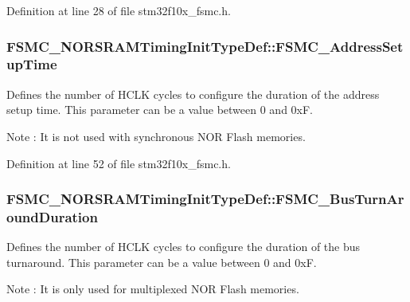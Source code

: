 Definition at line 28 of file stm32f10x\+\_\+fsmc.\+h.

\subsubsection[{\texorpdfstring{F\+S\+M\+C\+\_\+\+Address\+Setup\+Time}{FSMC_AddressSetupTime}}]{ F\+S\+M\+C\+\_\+\+N\+O\+R\+S\+R\+A\+M\+Timing\+Init\+Type\+Def\+::\+F\+S\+M\+C\+\_\+\+Address\+Setup\+Time}\hypertarget{struct_f_s_m_c___n_o_r_s_r_a_m_timing_init_type_def_a2ba90f4ec16bc38a2c4fa29c593b713b}{}\label{struct_f_s_m_c___n_o_r_s_r_a_m_timing_init_type_def_a2ba90f4ec16bc38a2c4fa29c593b713b}
Defines the number of H\+C\+LK cycles to configure the duration of the address setup time. This parameter can be a value between 0 and 0xF. \begin{DoxyNote}{Note}
\+: It is not used with synchronous N\+OR Flash memories. 
\end{DoxyNote}


Definition at line 52 of file stm32f10x\+\_\+fsmc.\+h.

\subsubsection[{\texorpdfstring{F\+S\+M\+C\+\_\+\+Bus\+Turn\+Around\+Duration}{FSMC_BusTurnAroundDuration}}]{ F\+S\+M\+C\+\_\+\+N\+O\+R\+S\+R\+A\+M\+Timing\+Init\+Type\+Def\+::\+F\+S\+M\+C\+\_\+\+Bus\+Turn\+Around\+Duration}\hypertarget{struct_f_s_m_c___n_o_r_s_r_a_m_timing_init_type_def_ab6cf3ade160c979c56d9239bcce4ac18}{}\label{struct_f_s_m_c___n_o_r_s_r_a_m_timing_init_type_def_ab6cf3ade160c979c56d9239bcce4ac18}
Defines the number of H\+C\+LK cycles to configure the duration of the bus turnaround. This parameter can be a value between 0 and 0xF. \begin{DoxyNote}{Note}
\+: It is only used for multiplexed N\+OR Flash memories. 
\end{DoxyNote}



